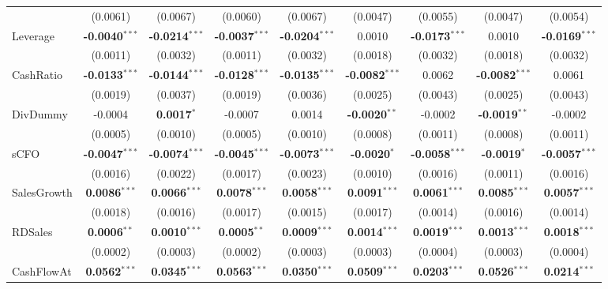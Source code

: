 \begin{landscape}
\begin{table}[H]
\begin{tabular}{lcccccccc}
 & (0.0061) & (0.0067) & (0.0060) & (0.0067) & (0.0047) & (0.0055) & (0.0047) & (0.0054) \\
Leverage & \textbf{-0.0040}$^{***}$ & \textbf{-0.0214}$^{***}$ & \textbf{-0.0037}$^{***}$ & \textbf{-0.0204}$^{***}$ & 0.0010 & \textbf{-0.0173}$^{***}$ & 0.0010 & \textbf{-0.0169}$^{***}$ \\
 & (0.0011) & (0.0032) & (0.0011) & (0.0032) & (0.0018) & (0.0032) & (0.0018) & (0.0032) \\
CashRatio & \textbf{-0.0133}$^{***}$ & \textbf{-0.0144}$^{***}$ & \textbf{-0.0128}$^{***}$ & \textbf{-0.0135}$^{***}$ & \textbf{-0.0082}$^{***}$ & 0.0062 & \textbf{-0.0082}$^{***}$ & 0.0061 \\
 & (0.0019) & (0.0037) & (0.0019) & (0.0036) & (0.0025) & (0.0043) & (0.0025) & (0.0043) \\
DivDummy & -0.0004 & \textbf{0.0017}$^{*}$ & -0.0007 & 0.0014 & \textbf{-0.0020}$^{**}$ & -0.0002 & \textbf{-0.0019}$^{**}$ & -0.0002 \\
 & (0.0005) & (0.0010) & (0.0005) & (0.0010) & (0.0008) & (0.0011) & (0.0008) & (0.0011) \\
sCFO & \textbf{-0.0047}$^{***}$ & \textbf{-0.0074}$^{***}$ & \textbf{-0.0045}$^{***}$ & \textbf{-0.0073}$^{***}$ & \textbf{-0.0020}$^{*}$ & \textbf{-0.0058}$^{***}$ & \textbf{-0.0019}$^{*}$ & \textbf{-0.0057}$^{***}$ \\
 & (0.0016) & (0.0022) & (0.0017) & (0.0023) & (0.0010) & (0.0016) & (0.0011) & (0.0016) \\
SalesGrowth & \textbf{0.0086}$^{***}$ & \textbf{0.0066}$^{***}$ & \textbf{0.0078}$^{***}$ & \textbf{0.0058}$^{***}$ & \textbf{0.0091}$^{***}$ & \textbf{0.0061}$^{***}$ & \textbf{0.0085}$^{***}$ & \textbf{0.0057}$^{***}$ \\
 & (0.0018) & (0.0016) & (0.0017) & (0.0015) & (0.0017) & (0.0014) & (0.0016) & (0.0014) \\
RDSales & \textbf{0.0006}$^{**}$ & \textbf{0.0010}$^{***}$ & \textbf{0.0005}$^{**}$ & \textbf{0.0009}$^{***}$ & \textbf{0.0014}$^{***}$ & \textbf{0.0019}$^{***}$ & \textbf{0.0013}$^{***}$ & \textbf{0.0018}$^{***}$ \\
 & (0.0002) & (0.0003) & (0.0002) & (0.0003) & (0.0003) & (0.0004) & (0.0003) & (0.0004) \\
CashFlowAt & \textbf{0.0562}$^{***}$ & \textbf{0.0345}$^{***}$ & \textbf{0.0563}$^{***}$ & \textbf{0.0350}$^{***}$ & \textbf{0.0509}$^{***}$ & \textbf{0.0203}$^{***}$ & \textbf{0.0526}$^{***}$ & \textbf{0.0214}$^{***}$ \\

\end{tabular}
\end{table}
\end{landscape}
